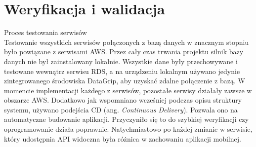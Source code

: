 \documentclass[a4paper,twoside,12pt]{book}
\newcommand{\obcy}[1]{\emph{#1}}
\newcommand{\ang}[1]{{\selectlanguage{british}\obcy{#1}}}
\begin{document}
\chapter{Weryfikacja i walidacja}
\begin{description}
\item Proces testowania serwisów \hfill \\
Testowanie wszystkich serwisów połączonych z bazą danych w znacznym stopniu było powiązane z serwisami AWS. Przez cały czas trwania projektu silnik bazy danych nie był zainstalowany lokalnie. Wszystkie dane były przechowywane i testowane wewnątrz serwisu RDS, a na urządzeniu lokalnym używano jedynie zintegrowanego środowiska DataGrip, aby uzyskać zdalne połączenie z bazą. W momencie implementacji każdego z serwisów, pozostałe serwisy działały zawsze w obszarze AWS. Dodatkowo jak wspomniano wcześniej podczas opisu struktury systemu, używano podejścia CD (ang. \ang{Continuous Delivery}). Pozwala ono na automatyczne budowanie aplikacji. Przyczyniło się to do szybkiej weryfikacji czy oprogramowanie działa poprawnie. Natychmiastowo po każdej zmianie w serwisie, który udostępnia API widoczna była różnica w zachowaniu aplikacji mobilnej. 


\end{description}
\end{document}
